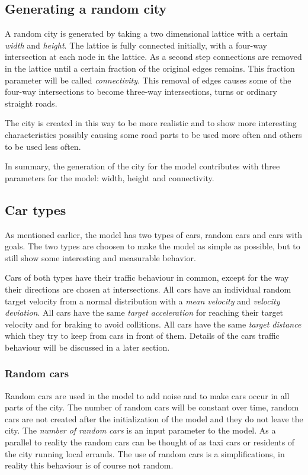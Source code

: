 \documentclass[11pt,a4paper]{article}
\begin{document}
\subsection{Generating a random city}
A random city is generated by taking a two dimensional lattice with a certain \textit{width} and \textit{height}. The lattice is fully connected initially, with a four-way intersection at each node in the lattice. As a second step connections are removed in the lattice until a certain fraction of the original edges remains. This fraction parameter will be called \textit{connectivity}. This removal of edges causes some of the four-way intersections to become three-way intersections, turns or ordinary straight roads.

The city is created in this way to be more realistic and to show more interesting characteristics possibly causing some road parts to be used more often and others to be used less often.

In summary, the generation of the city for the model contributes with three parameters for the model: width, height and connectivity.
\subsection{Car types}
As mentioned earlier, the model has two types of cars, random cars and cars with goals. The two types are choosen to make the model as simple as possible, but to still show some interesting and measurable behavior.

Cars of both types have their traffic behaviour in common, except for the way their directions are chosen at intersections. All cars have an individual random target velocity from a normal distribution with a \textit{mean velocity} and \textit{velocity deviation}. All cars have the same \textit{target acceleration} for reaching their target velocity and for braking to avoid collitions. All cars have the same \textit{target distance} which they try to keep from cars in front of them. Details of the cars traffic behaviour will be discussed in a later section.
\subsubsection{Random cars}
Random cars are used in the model to add noise and to make cars occur in all parts of the city. The number of random cars will be constant over time, random cars are not created after the initialization of the model and they do not leave the city. The \textit{number of random cars} is an input parameter to the model. As a parallel to reality the random cars can be thought of as taxi cars or residents of the city running local errands. The use of random cars is a simplifications, in reality this behaviour is of course not random.
\end{document}
